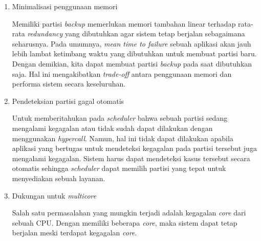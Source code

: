\begin{enumerate}

	\item Minimalisasi penggunaan memori

		Memiliki partisi \textit{backup} memerlukan memori tambahan linear terhadap
		rata-rata \textit{redundancy} yang dibutuhkan agar sistem tetap berjalan
		sebagaimana seharusnya. Pada umumnya, \textit{mean time to failure} sebuah
		aplikasi akan jauh lebih lambat ketimbang waktu yang dibutuhkan untuk membuat
		partisi baru. Dengan demikian, kita dapat membuat partisi \textit{backup} pada
		saat dibutuhkan saja. Hal ini mengakibatkan \textit{trade-off} antara penggunaan
		memori dan performa sistem secara keseluruhan.

	\item Pendeteksian partisi gagal otomatis

		Untuk memberitahukan pada \textit{scheduler} bahwa sebuah partisi sedang
		mengalami kegagalan atau tidak sudah dapat dilakukan dengan menggunakan
		\textit{hypercall}. Namun, hal ini tidak dapat dilakukan apabila aplikasi yang
		bertugas untuk mendeteksi kegagalan pada partisi tersebut juga mengalami
		kegagalan. Sistem harus dapat mendeteksi kasus tersebut secara otomatis sehingga
		\textit{scheduler} dapat memilih partisi yang tepat untuk menyediakan sebuah
		layanan.

	\item Dukungan untuk \textit{multicore}

		Salah satu permasalahan yang mungkin terjadi adalah kegagalan \textit{core} dari
		sebuah CPU. Dengan memiliki beberapa \textit{core}, maka sistem dapat tetap berjalan
		meski terdapat kegagalan \textit{core}.

\end{enumerate}

